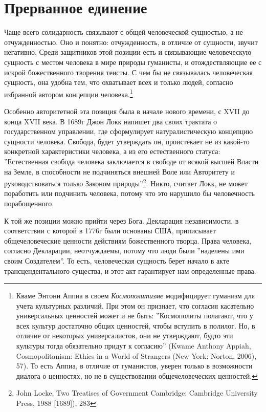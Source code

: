 \documentclass[12pt]{book}
\begin{document}
\section{Прерванное единение}

Чаще всего солидарность связывают с общей человеческой сущностью, а не отчужденностью. Оно и понятно: отчужденность, в отличие от сущности, звучит негативно. Среди защитников этой позиции есть и связывающие человеческую сущность с местом человека в мире природы гуманисты, и отождествляющие ее с искрой божественного творения теисты. С чем бы не связывалась человеческая сущность, она удобна тем, что охватывает всех и только людей, согласно избранной автором концепции человека.\footnote{Кваме Энтони Аппиа в своем \textit{Космополитизме} модифицирует гуманизм для учета культурных различий. При этом он признает, что согласия касательно универсальных ценностей может и не быть: ''Космополиты полагают, что у всех культур достаточно общих ценностей, чтобы вступить в полилог. Но, в отличие от некоторых универсалистов, они не утверждают, будто эти культуры тогда обязательно придут к согласию'' (Kwame Anthony Appiah, Cosmopolitanism: Ethics in a World of Strangers (New York: Norton, 2006), 57). То есть Аппиа, в отличие от гуманистов, уверен только в возможности диалога о ценностях, но не в существовании общечеловеческих ценностей.} 

Особенно авторитетной эта позиция была в начале нового времени, с XVII до конца XVII века. В 1689г Джон Локк напишет два своих трактата о государственном управлении, где сформулирует натуралистическую концепцию сущности человека. Свобода, будет утверждать он, проистекает не из какой-то конкретной характеристики человека, а из его естественного статуса: ''Естественная свобода человека заключается в свободе от всякой высшей Власти на Земле, в способности не подчиняться внешней Воле или Авторитету и руководствоваться только Законом природы''\footnote{John Locke, Two Treatises of Government  Cambridge: Cambridge University Press, 1988 [1689]), 283}. Никто, считает Локк, не может поработить или подчинить человека, потому что это нарушило бы человечность порабощенного.

К той же позиции можно прийти через Бога. Декларация независимости, в соответствии с которой в 1776г были основаны США, приписывает общечеловеческие ценности действиям божественного творца. Права человека, согласно Декларации, неотчуждаемы, потому что люди были ''наделены ими своим Создателем''. То есть, человеческая сущность берет начало в акте трансцендентального существа, и этот акт гарантирует нам определенные права.
\end{document}
